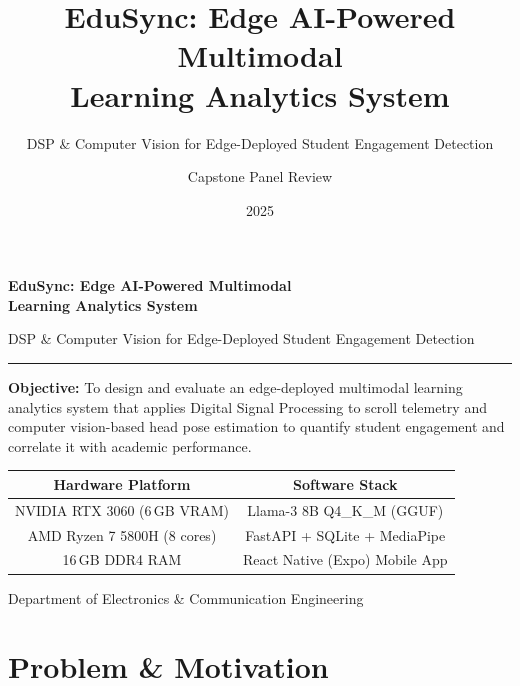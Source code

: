 \documentclass[aspectratio=169,10pt]{beamer}
\title[EduSync]{EduSync: Edge AI-Powered Multimodal\\Learning Analytics System}
\subtitle{DSP \& Computer Vision for Edge-Deployed Student Engagement Detection}
\author{Capstone Panel Review}
\date{2025}
\institute{Department of Electronics \& Communication Engineering}
\begin{document}
\begin{frame}[plain]
\vspace{1cm}
\begin{center}
{\Large\bfseries\color{ecublue} EduSync: Edge AI-Powered Multimodal\\[4pt] Learning Analytics System}

\vspace{6pt}
{\small DSP \& Computer Vision for Edge-Deployed Student Engagement Detection}

\vspace{10pt}
\rule{0.6\textwidth}{0.4pt}

\vspace{8pt}
{\footnotesize\textbf{Objective:} To design and evaluate an edge-deployed multimodal learning analytics system that applies Digital Signal Processing to scroll telemetry and computer vision-based head pose estimation to quantify student engagement and correlate it with academic performance.}

\vspace{10pt}
\begin{tabular}{cc}
\textbf{Hardware Platform} & \textbf{Software Stack} \\
\midrule
NVIDIA RTX 3060 (6\,GB VRAM) & Llama-3 8B Q4\_K\_M (GGUF) \\
AMD Ryzen 7 5800H (8 cores) & FastAPI + SQLite + MediaPipe \\
16\,GB DDR4 RAM & React Native (Expo) Mobile App \\
\end{tabular}
\end{center}

\vspace{6pt}
\begin{center}
{\scriptsize Department of Electronics \& Communication Engineering}
\end{center}
\end{frame}

\section{Problem \& Motivation}
\end{document}
